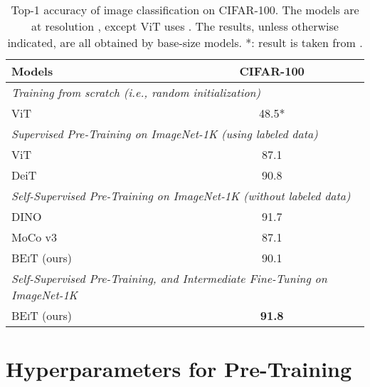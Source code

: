 \documentclass{article}
\newcommand\our{\textsc{BEiT}}
\begin{document}
\begin{table}[h]
\centering
\begin{tabular}{@{}lc@{}}
\toprule
\bf Models & \bf CIFAR-100 \\
\midrule
\multicolumn{2}{l}{\textit{Training from scratch (i.e., random initialization)}} \\
ViT~\citep{vit} & 48.5* \\
\midrule
\multicolumn{2}{l}{\textit{Supervised Pre-Training on ImageNet-1K (using labeled data)}} \\
ViT~\citep{vit} & 87.1 \\
DeiT~\citep{deit}           & 90.8 \\
\midrule
\multicolumn{2}{l}{\textit{Self-Supervised Pre-Training on ImageNet-1K (without labeled data)}} \\
DINO~\citep{dino}           & 91.7 \\
MoCo v3~\citep{mocov3}           & 87.1 \\
\our{} (ours)                                    & 90.1 \\
\midrule
\multicolumn{2}{l}{\textit{Self-Supervised Pre-Training, and Intermediate Fine-Tuning on ImageNet-1K}} \\
\our{} (ours)                                     &  \bf 91.8 \\
\bottomrule
\end{tabular}
\caption{Top-1 accuracy of image classification on CIFAR-100.
The models are at resolution , except ViT uses .
The results, unless otherwise indicated, are all obtained by base-size models.
*: result is taken from \citep{mocov3}.}
\label{tbl:results:cifar}
\end{table}


\section{Hyperparameters for Pre-Training}
\label{app:pretrain}
\end{document}
